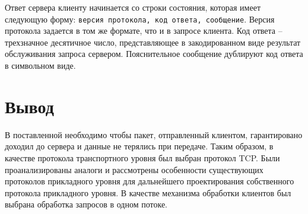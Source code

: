 Ответ сервера клиенту начинается со строки состояния, которая имеет следующую форму: \texttt{версия протокола, код ответа, сообщение}. Версия протокола задается в том же формате, что и в запросе клиента. Код ответа -- трехзначное десятичное число, представляющее в закодированном виде результат обслуживания запроса сервером. Пояснительное сообщение дублируют код ответа в символьном виде.

\section*{Вывод}

В поставленной необходимо чтобы пакет, отправленный клиентом, гарантировано доходил до сервера и данные не терялись при передаче. Таким образом, в качестве протокола транспортного уровня был выбран протокол TCP. Были проанализированы аналоги и рассмотрены особенности существующих протоколов прикладного уровня для дальнейшего проектирования собственного протокола прикладного уровня. В качестве механизма обработки клиентов был выбрана обработка запросов в одном потоке.



